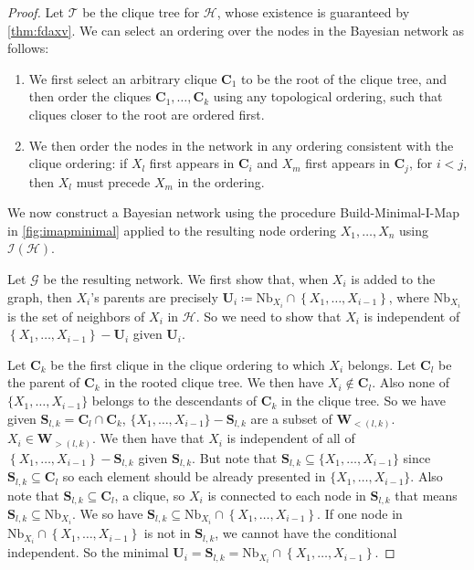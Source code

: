 \documentclass{article}
\begin{document}
\begin{proof}
Let $\mathcal{T}$ be the clique tree for $\mathcal{H}$, whose existence is guaranteed by \cref{thm:fdaxv}. We can select an ordering over the nodes in the Bayesian network as follows:
\begin{enumerate}
    \item {} We first select an arbitrary clique $\boldsymbol{C}_{1}$ to be the root of the clique tree, and then order the cliques $\boldsymbol{C}_{1}, \ldots, \boldsymbol{C}_{k}$ using any topological ordering, such that cliques closer to the root are ordered first.
\item {} We then order the nodes in the network in any ordering consistent with the clique ordering: if $X_{l}$ first appears in $\boldsymbol{C}_{i}$ and $X_{m}$ first appears in $\boldsymbol{C}_{j}$, for $i<j$, then $X_{l}$ must precede $X_{m}$ in the ordering.
\end{enumerate}  We now construct a Bayesian network using the procedure Build-Minimal-I-Map in \cref{fig:imapminimal} applied to the resulting node ordering $X_{1}, \ldots, X_{n}$ using $\mathcal{I}(\mathcal{H})$.

Let $\mathcal{G}$ be the resulting network. We first show that, when $X_{i}$ is added to the graph, then $X_{i}$'s parents are precisely $\boldsymbol{U}_{i}\coloneqq\mathrm{Nb}_{X_{i}} \cap\left\{X_{1}, \ldots, X_{i-1}\right\}$, where $\mathrm{Nb}_{X_{i}}$ is the set of neighbors of $X_{i}$ in $\mathcal{H}$. So we need to show that $X_{i}$ is independent of $\left\{X_{1}, \ldots, X_{i-1}\right\}-\boldsymbol{U}_{i}$ given $\boldsymbol{U}_{i}$.

Let $\boldsymbol{C}_{k}$ be the first clique in the clique ordering to which $X_{i}$ belongs.  Let $\boldsymbol{C}_{l}$ be the parent of $\boldsymbol{C}_{k}$ in the rooted clique tree. We then have $X_i\notin \boldsymbol{C}_l$. Also none of $\{X_{1}, \ldots, X_{i-1}\}$ belongs to the  descendants of $\boldsymbol{C}_{k}$ in the clique tree. So we have given $\boldsymbol{S}_{l,k}=\boldsymbol{C}_{l}\cap \boldsymbol{C}_{k}$,  $\{X_{1}, \ldots, X_{i-1}\}-\boldsymbol{S}_{l,k}$ are a subset of $\boldsymbol{W}_{<(l, k)}$. $X_i\in \boldsymbol{W}_{>(l, k)}$. We then have that   $X_{i}$ is independent of all of $\left\{X_{1}, \ldots, X_{i-1}\right\}-\boldsymbol{S}_{l,k}$ given $\boldsymbol{S}_{l,k}$. But note that $\boldsymbol{S}_{l,k}\subseteq\{X_{1}, \ldots, X_{i-1}\}$ since $\boldsymbol{S}_{l,k}\subseteq\boldsymbol{C}_l$ so each element should be already presented in $\{X_{1}, \ldots, X_{i-1}\}$. Also note that $\boldsymbol{S}_{l,k}\subseteq\boldsymbol{C}_l$, a clique, so $X_i$ is connected to each node in $\boldsymbol{S}_{l,k}$ that means $\boldsymbol{S}_{l,k}\subseteq\mathrm{Nb}_{X_i}$. We so have $\boldsymbol{S}_{l,k}\subseteq\mathrm{Nb}_{X_{i}} \cap\left\{X_{1}, \ldots, X_{i-1}\right\}$. If one node in $\mathrm{Nb}_{X_{i}} \cap\left\{X_{1}, \ldots, X_{i-1}\right\}$ is not in $\boldsymbol{S}_{l,k}$, we cannot have the conditional independent. So the minimal $\boldsymbol{U}_i=\boldsymbol{S}_{l,k}=\mathrm{Nb}_{X_{i}} \cap\left\{X_{1}, \ldots, X_{i-1}\right\}$.


\end{proof}
\end{document}
